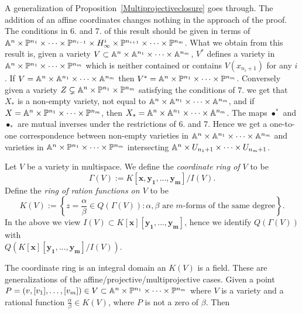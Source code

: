         \begin{remark}\label{WeMayReduceMultiprojectiveCaseToAffineCaseUsingAProperTransformationIfVarietiesDoNotContainCertainHyperplanesAtInfinity}
            A generalization of Proposition~\ref{Multiprojectiveclosure} goes through. The addition of an affine coordinates changes nothing in the approach of the proof. The conditions in 6. and 7. of this result should be given in terms of  $\mathbb{A}^n\times \mathbb{P}^{n_1} \times \cdots\times \mathbb{P}^{n_{i-1}}\times H^i_\infty\times \mathbb{P}^{n_{i+1}}\times \cdots \times \mathbb{P}^{n_m}$. What we obtain from this result is, given a variety $V\subset \mathbb{A}^n\times \mathbb{A}^{n_1}\times\cdots\times \mathbb{A}^{n_m}$, $V^\ast$ defines a variety in $\mathbb{A}^n\times \mathbb{P}^{n_1}\times \cdots \times \mathbb{P}^{n_m}$ which is neither contained or contains $V(x_{n_i+1})$ for any $i$. If $V=\mathbb{A}^{n}\times \mathbb{A}^{n_1}\times \cdots\times \mathbb{A}^{n_m}$ then $V^\ast = \mathbb{A}^{n}\times \mathbb{P}^{n_1}\times \cdots \times \mathbb{P}^{n_m}$. Conversely given a variety $Z \subsetneq \mathbb{A}^n\times \mathbb{P}^{n_1}\times \mathbb{P}^{n_m}$ satisfying the conditions of 7. we get that $X_\ast$ is a non-empty variety, not equal to $\mathbb{A}^n\times\mathbb{A}^{n_1}\times \cdots\times\mathbb{A}^{n_m}$, and if $X=\mathbb{A}^n\times \mathbb{P}^{n_1}\times\cdots\times\mathbb{P}^{n_m}$, then $X_\ast = \mathbb{A}^{n}\times\mathbb{A}^{n_1}\times\cdots \times \mathbb{A}^{n_m}$. The maps $\bullet^\ast$ and $\bullet_\ast$ are mutual inverses under the restrictions of 6. and 7. Hence we get a one-to-one correspondence between non-empty varieties in $\mathbb{A}^n\times\mathbb{A}^{n_1}\times\cdots\times\mathbb{A}^{n_m}$ and varieties in $\mathbb{A}^n\times\mathbb{P}^{n_1}\times\cdots\times\mathbb{P}^{n_m}$ intersecting $\mathbb{A}^n\times U_{n_1+1}\times\cdots\times U_{n_m+1}$. 
        \end{remark}
        \begin{definition}
            Let $V$ be a variety in multispace. We define the \textit{coordinate ring of $V$} to be 
            $$\Gamma(V):=K[\mathbf{x},\mathbf{y_1},\dots,\mathbf{y_m}]/I(V).$$
            Define the \textit{ring of ration functions on $V$} to be
            $$K(V):= \left\{ z=\frac{\alpha}{\beta} \in Q(\Gamma(V)) :  \alpha,\beta \text{ are $m$-forms of the same degree}\right\}.$$
            In the above we view $I(V)\subset K[\mathbf{x}][\mathbf{y_1},\dots,\mathbf{y_m}]$, hence we identify $Q(\Gamma(V))$ with\\ $Q(K[\mathbf{x}][\mathbf{y_1},\dots,\mathbf{y_m}]/I(V))$.
        \end{definition}
        The coordinate ring is an integral domain an $K(V)$ is a field. These are generalizations of the affine/projective/multiprojective cases. Given a point $P=(v,[v_1],\dots,[v_m])\in V\subset \mathbb{A}^n\times \mathbb{P}^{n_1}\times \cdots \times \mathbb{P}^{n_m}$ where $V$ is a variety and a rational function $\frac{\alpha}{\beta}\in K(V)$, where $P$ is not a zero of $\beta$. Then 
